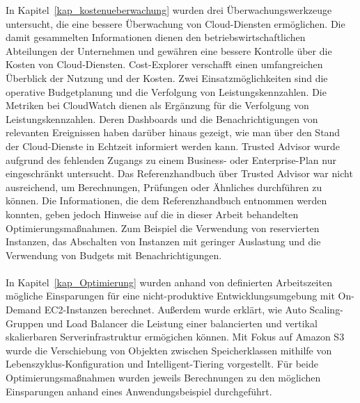 In Kapitel~\ref{kap_kostenueberwachung} wurden drei Überwachungswerkzeuge untersucht, die eine bessere Überwachung von Cloud-Diensten ermöglichen. Die damit gesammelten Informationen dienen den betriebswirtschaftlichen Abteilungen der Unternehmen und gewähren eine bessere Kontrolle über die Kosten von Cloud-Diensten. Cost-Explorer verschafft einen umfangreichen Überblick der Nutzung und der Kosten. Zwei Einsatzmöglichkeiten sind die operative Budgetplanung und die Verfolgung von Leistungskennzahlen. Die Metriken bei CloudWatch dienen als Ergänzung für die Verfolgung von Leistungskennzahlen. Deren Dashboards und die Benachrichtigungen von relevanten Ereignissen haben darüber hinaus gezeigt, wie man über den Stand der Cloud-Dienste in Echtzeit informiert werden kann.
%
Trusted Advisor wurde aufgrund des fehlenden Zugangs zu einem Business- oder Enterprise-Plan nur eingeschränkt untersucht. 
Das Referenzhandbuch über Trusted Advisor war nicht ausreichend, um Berechnungen, Prüfungen oder Ähnliches durchführen zu können. Die Informationen, die dem Referenzhandbuch entnommen werden konnten, geben jedoch Hinweise auf die in dieser Arbeit behandelten Optimierungsmaßnahmen. %
Zum Beispiel die Verwendung von reservierten Instanzen, das Abschalten von Instanzen mit geringer Auslastung und die Verwendung von Budgets mit Benachrichtigungen.
\\\\
In Kapitel~\ref{kap_Optimierung} wurden anhand von definierten Arbeitszeiten mögliche Einsparungen für eine nicht-produktive Entwicklungsumgebung mit On-Demand EC2-Instanzen berechnet. Außerdem wurde erklärt, wie Auto Scaling-Gruppen und Load Balancer die Leistung einer balancierten und vertikal skalierbaren Serverinfrastruktur ermögichen können. Mit Fokus auf Amazon S3 wurde die Verschiebung von Objekten zwischen Speicherklassen mithilfe von Lebenszyklus-Konfiguration und Intelligent-Tiering vorgestellt. Für beide Optimierungsmaßnahmen wurden jeweils Berechnungen zu den möglichen Einsparungen anhand eines Anwendungsbeispiel durchgeführt.
